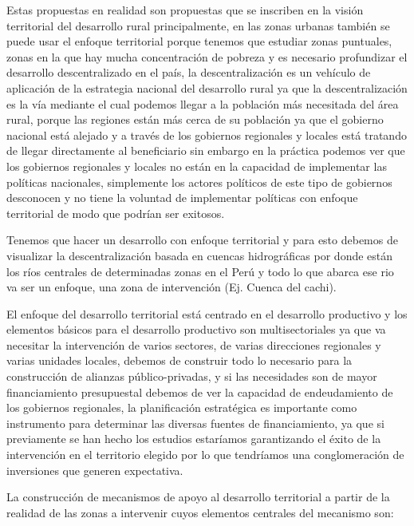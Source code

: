 \documentclass[
  letterpaper,
  DIV=11,
  numbers=noendperiod]{scrartcl}
\begin{document}
Estas propuestas en realidad son propuestas que se inscriben en la
visión territorial del desarrollo rural principalmente, en las zonas
urbanas también se puede usar el enfoque territorial porque tenemos que
estudiar zonas puntuales, zonas en la que hay mucha concentración de
pobreza y es necesario profundizar el desarrollo descentralizado en el
país, la descentralización es un vehículo de aplicación de la estrategia
nacional del desarrollo rural ya que la descentralización es la vía
mediante el cual podemos llegar a la población más necesitada del área
rural, porque las regiones están más cerca de su población ya que el
gobierno nacional está alejado y a través de los gobiernos regionales y
locales está tratando de llegar directamente al beneficiario sin embargo
en la práctica podemos ver que los gobiernos regionales y locales no
están en la capacidad de implementar las políticas nacionales,
simplemente los actores políticos de este tipo de gobiernos desconocen y
no tiene la voluntad de implementar políticas con enfoque territorial de
modo que podrían ser exitosos.

Tenemos que hacer un desarrollo con enfoque territorial y para esto
debemos de visualizar la descentralización basada en cuencas
hidrográficas por donde están los ríos centrales de determinadas zonas
en el Perú y todo lo que abarca ese rio va ser un enfoque, una zona de
intervención (Ej. Cuenca del cachi).

El enfoque del desarrollo territorial está centrado en el desarrollo
productivo y los elementos básicos para el desarrollo productivo son
multisectoriales ya que va necesitar la intervención de varios sectores,
de varias direcciones regionales y varias unidades locales, debemos de
construir todo lo necesario para la construcción de alianzas
público-privadas, y si las necesidades son de mayor financiamiento
presupuestal debemos de ver la capacidad de endeudamiento de los
gobiernos regionales, la planificación estratégica es importante como
instrumento para determinar las diversas fuentes de financiamiento, ya
que si previamente se han hecho los estudios estaríamos garantizando el
éxito de la intervención en el territorio elegido por lo que tendríamos
una conglomeración de inversiones que generen expectativa.

La construcción de mecanismos de apoyo al desarrollo territorial a
partir de la realidad de las zonas a intervenir cuyos elementos
centrales del mecanismo son:
\end{document}
